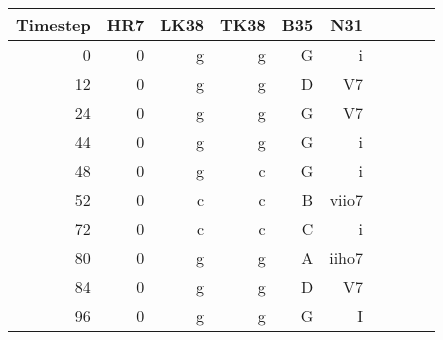 \begin{tabular}{r|rrrrrrrrr}
Timestep & HR7 & LK38 & TK38 & B35   & N31   \\ \hline
0        & 0   & g    & g    & G     & i     \\
12       & 0   & g    & g    & D     & V7    \\
24       & 0   & g    & g    & G     & V7    \\
44       & 0   & g    & g    & G     & i     \\ \hline
48       & 0   & g    & c    & G     & i     \\
52       & 0   & c    & c    & B     & viio7 \\
72       & 0   & c    & c    & C     & i     \\
80       & 0   & g    & g    & A     & iiho7 \\
84       & 0   & g    & g    & D     & V7    \\
96       & 0   & g    & g    & G     & I     \\
\end{tabular}
